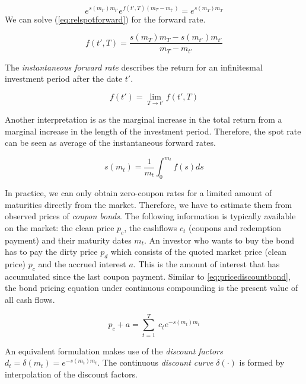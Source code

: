 \begin{equation}
  \label{eq:relspotforward}
  e^{s(m_{t'}) m_{t'}}e^{f(t',T)(m_T-m_{t'})} = e^{s(m_T) m_T}
\end{equation}
We can solve (\ref{eq:relspotforward}) for the forward rate.

\begin{equation}
  \label{eq:forwardrate}
  f(t',T) = \frac{s(m_T)m_T - s(m_{t'})m_{t'}}{m_T-m_{t'}}
\end{equation}

The \emph{instantaneous forward rate} describes the return for an infinitesmal investment period after the date $t'$.

\begin{equation}
  \label{eq:instforw}
  f(t') = \lim_{T\rightarrow t'}f(t',T)
\end{equation}

Another interpretation is as the marginal increase in the total return from a marginal increase in the length of the investment period. Therefore, the spot rate can be seen as average of the instantaneous forward rates.

\begin{equation}
  \label{eq:avgforwardrate}
  s(m_t)=\frac{1}{m_t}\int_0^{m_t}f(s)ds
\end{equation}

In practice, we can only obtain zero-coupon rates for a limited amount of maturities directly from the market. Therefore, we have to estimate them from observed prices of \emph{coupon bonds}. The following information is typically available on the market: the clean price $p_c$, the cashflows $c_t$ (coupons and redemption payment) and their maturity dates $m_t$. An investor who wants to buy the bond has to pay the dirty price $p_d$ which consists of the quoted market price (clean price) $p_c$ and the accrued interest $a$. This is the amount of interest that has accumulated since the last coupon payment. Similar to \eqref{eq:pricediscountbond}, the bond pricing equation under continuous compounding is the present value of all cash flows.

\begin{equation}
  \label{bondpriceeq}
  p_c+a = \sum_{t=1}^T \ c_t e^{-s(m_t)m_t}
\end{equation}

An equivalent formulation makes use of the \emph{discount factors} $d_t=\delta(m_t)=e^{-s(m_t)m_t}$. The continuous \emph{discount curve} $\delta(\cdot)$ is formed by interpolation of the discount factors.


